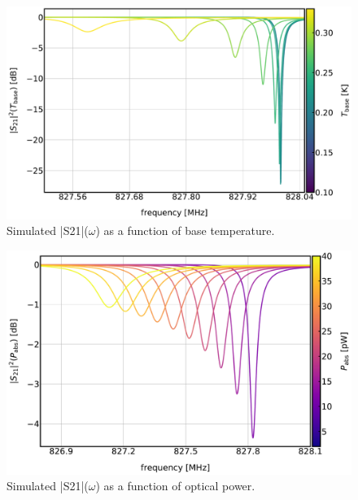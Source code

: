 \begin{figure}[!htbp]
  \centering
  \includegraphics[width=\textwidth]{figures/kid_model/S21_T250}
  \caption[Simulated  as a function of base temperature.]{Simulated |\gls{S21}|($\omega$) as a function of base temperature.}
\label{fig:S21_T}
\end{figure}

\begin{figure}[!htbp]
  \centering
  \includegraphics[width=\textwidth]{figures/kid_model/S21_opt250}
  \caption[Simulated  as a function of optical power.]{Simulated |\gls{S21}|($\omega$) as a function of optical power.}
\label{fig:S21_opt}
\end{figure}

